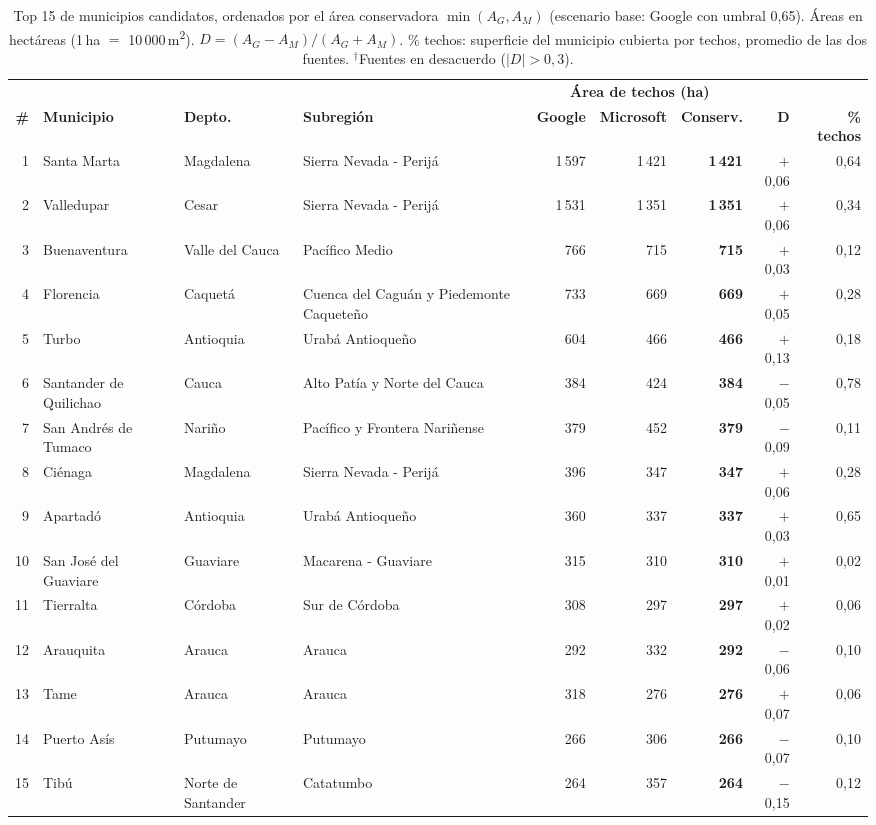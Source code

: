 \begin{table}[H]
\centering\scriptsize
\caption{Top 15 de municipios candidatos, ordenados por el área conservadora $\min(A_G, A_M)$ (escenario base: Google con umbral 0,65). Áreas en hectáreas (1\,ha $=$ 10\,000\,m\textsuperscript{2}). $D = (A_G - A_M)/(A_G + A_M)$. \% techos: superficie del municipio cubierta por techos, promedio de las dos fuentes. $^{\dagger}$Fuentes en desacuerdo ($|D| > 0,3$).}
\label{tab:ranking}
\setlength{\tabcolsep}{3.5pt}
\begin{tabularx}{\textwidth}{@{}r>{\raggedright\arraybackslash}p{2.6cm}>{\raggedright\arraybackslash}p{1.7cm}>{\raggedright\arraybackslash}Xrrrrr@{}}
\toprule
 & & & & \multicolumn{3}{c}{\textbf{Área de techos (ha)}} & & \\
\cmidrule(lr){5-7}
\textbf{\#} & \textbf{Municipio} & \textbf{Depto.} & \textbf{Subregión} & \textbf{Google} & \textbf{Microsoft} & \textbf{Conserv.} & $\boldsymbol{D}$ & \textbf{\% techos} \\
\midrule
1 & Santa Marta & Magdalena & Sierra Nevada - Perijá & 1\,597 & 1\,421 & \textbf{1\,421} & $+$0,06 & 0,64 \\
2 & Valledupar & Cesar & Sierra Nevada - Perijá & 1\,531 & 1\,351 & \textbf{1\,351} & $+$0,06 & 0,34 \\
3 & Buenaventura & Valle del Cauca & Pacífico Medio & 766 & 715 & \textbf{715} & $+$0,03 & 0,12 \\
4 & Florencia & Caquetá & Cuenca del Caguán y Piedemonte Caqueteño & 733 & 669 & \textbf{669} & $+$0,05 & 0,28 \\
5 & Turbo & Antioquia & Urabá Antioqueño & 604 & 466 & \textbf{466} & $+$0,13 & 0,18 \\
6 & Santander de Quilichao & Cauca & Alto Patía y Norte del Cauca & 384 & 424 & \textbf{384} & $-$0,05 & 0,78 \\
7 & San Andrés de Tumaco & Nariño & Pacífico y Frontera Nariñense & 379 & 452 & \textbf{379} & $-$0,09 & 0,11 \\
8 & Ciénaga & Magdalena & Sierra Nevada - Perijá & 396 & 347 & \textbf{347} & $+$0,06 & 0,28 \\
9 & Apartadó & Antioquia & Urabá Antioqueño & 360 & 337 & \textbf{337} & $+$0,03 & 0,65 \\
10 & San José del Guaviare & Guaviare & Macarena - Guaviare & 315 & 310 & \textbf{310} & $+$0,01 & 0,02 \\
11 & Tierralta & Córdoba & Sur de Córdoba & 308 & 297 & \textbf{297} & $+$0,02 & 0,06 \\
12 & Arauquita & Arauca & Arauca & 292 & 332 & \textbf{292} & $-$0,06 & 0,10 \\
13 & Tame & Arauca & Arauca & 318 & 276 & \textbf{276} & $+$0,07 & 0,06 \\
14 & Puerto Asís & Putumayo & Putumayo & 266 & 306 & \textbf{266} & $-$0,07 & 0,10 \\
15 & Tibú & Norte de Santander & Catatumbo & 264 & 357 & \textbf{264} & $-$0,15 & 0,12 \\
\bottomrule
\end{tabularx}
\end{table}
